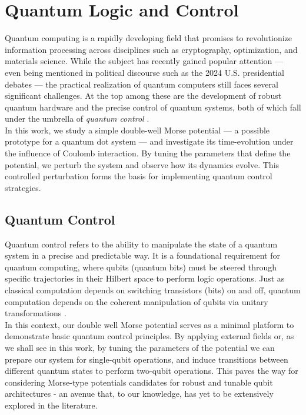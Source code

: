 \documentclass{subfiles}
\begin{document}
\section{Quantum Logic and Control}
Quantum computing is a rapidly developing field that promises to revolutionize information processing across disciplines such as cryptography, optimization, and materials science. While the subject has recently gained popular attention — even being mentioned in political discourse such as the 2024 U.S. presidential debates — the practical realization of quantum computers still faces several significant challenges. At the top among these are the development of robust quantum hardware and the precise control of quantum systems, both of which fall under the umbrella of \emph{quantum control} \cite{lau2022nisq}. \\ 

In this work, we study a simple double-well Morse potential — a possible prototype for a quantum dot system — and investigate its time-evolution under the influence of Coulomb interaction. By tuning the parameters that define the potential, we perturb the system and observe how its dynamics evolve. This controlled perturbation forms the basis for implementing quantum control strategies.
\subsection{Quantum Control}
Quantum control refers to the ability to manipulate the state of a quantum system in a precise and predictable way. It is a foundational requirement for quantum computing, where qubits (quantum bits) must be steered through specific trajectories in their Hilbert space to perform logic operations. Just as classical computation depends on switching transistors (bits) on and off, quantum computation depends on the coherent manipulation of qubits via unitary transformations \cite{nielsen2010quantum}. \\ 

In this context, our double well Morse potential serves as a minimal platform to demonstrate basic quantum control principles. By applying external fields or, as we shall see in this work, by tuning the parameters of the potential we can prepare our system for single-qubit operations, and induce transitions between different quantum states to perform two-qubit operations. This paves the way for considering Morse-type potentials candidates for robust and tunable qubit architectures - an avenue that, to our knowledge, has yet to be extensively explored in the literature. \\ 
\end{document}
